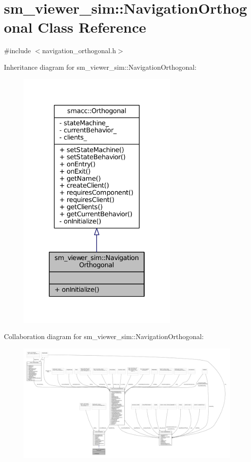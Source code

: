 \hypertarget{classsm__viewer__sim_1_1NavigationOrthogonal}{}\section{sm\+\_\+viewer\+\_\+sim\+:\+:Navigation\+Orthogonal Class Reference}
\label{classsm__viewer__sim_1_1NavigationOrthogonal}


{\ttfamily \#include $<$navigation\+\_\+orthogonal.\+h$>$}



Inheritance diagram for sm\+\_\+viewer\+\_\+sim\+:\+:Navigation\+Orthogonal\+:
\nopagebreak
\begin{figure}[H]
\begin{center}
\leavevmode
\includegraphics[width=226pt]{classsm__viewer__sim_1_1NavigationOrthogonal__inherit__graph}
\end{center}
\end{figure}


Collaboration diagram for sm\+\_\+viewer\+\_\+sim\+:\+:Navigation\+Orthogonal\+:
\nopagebreak
\begin{figure}[H]
\begin{center}
\leavevmode
\includegraphics[width=350pt]{classsm__viewer__sim_1_1NavigationOrthogonal__coll__graph}
\end{center}
\end{figure}
